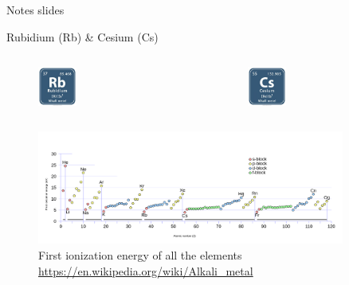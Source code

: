 \documentclass[10pt]{beamer}
\begin{document}
\appendix

\begin{frame}[standout]
    Notes slides
\end{frame}



\begin{frame}{Rubidium (Rb) \& Cesium (Cs)}

    \begin{columns}

        \begin{figure}
            \centering
            \includegraphics[width=0.3\textwidth]{img/Rubidium-Symbol}
        \end{figure}

        \begin{figure}
            \centering
            \includegraphics[width=0.3\textwidth]{img/Cesium-Symbol}
        \end{figure}

    \end{columns}

    \begin{figure}
        \centering
        \includegraphics[width=0.9\textwidth]{img/First_Ionization_Energy}
        \caption{First ionization energy of all the elements \url{https://en.wikipedia.org/wiki/Alkali_metal}}
    \end{figure}

\end{frame}
\end{document}
